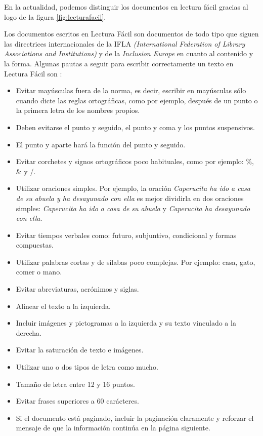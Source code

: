 En la actualidad, podemos distinguir los documentos en lectura fácil gracias al logo de la figura \ref{fig:lecturafacil}.

	
	
Los documentos escritos en Lectura Fácil \citep{wiki:lecturafacil} son documentos de todo tipo que siguen las directrices internacionales de la IFLA \textit{ (International Federation of Library Associations and Institutions)} y de la \textit{ Inclusion Europe} en cuanto al contenido y la forma.
Algunas pautas a seguir para escribir correctamente un texto en Lectura Fácil son \citep{GarciaMunoz2012LecturaFacil}:


\begin{itemize}
	\item Evitar mayúsculas fuera de la norma, es decir, escribir en mayúsculas sólo cuando dicte las reglas ortográficas, como por ejemplo, después de un punto o la primera letra de los nombres propios.
	\item Deben evitarse el punto y seguido, el punto y coma y los puntos suspensivos.
	\item El punto y aparte hará la función del punto y seguido.
	\item Evitar corchetes y signos ortográficos poco habituales, como por ejemplo: \%, \& y /.
	\item Utilizar oraciones simples. Por ejemplo, la oración \textit{Caperucita ha ido a casa de su abuela y ha desayunado con ella} es mejor dividirla en dos oraciones simples:\textit{ Caperucita ha ido a casa de su abuela} y  \textit{Caperucita ha desayunado con ella}.
	\item Evitar tiempos verbales como: futuro, subjuntivo, condicional y formas compuestas.
	\item Utilizar palabras cortas y de sílabas poco complejas. Por ejemplo: casa, gato, comer o mano.
	\item Evitar abreviaturas, acrónimos y siglas.
	\item Alinear el texto a la izquierda.
	\item Incluir imágenes y pictogramas a la izquierda y su texto vinculado a la derecha.
	\item Evitar la saturación de texto e imágenes.
	\item Utilizar uno o dos tipos de letra como mucho.
	\item Tamaño de letra entre 12 y 16 puntos.
	\item Evitar frases superiores a 60 carácteres.
	\item Si el documento está paginado, incluir la paginación claramente y reforzar el mensaje de que la información continúa en la página siguiente.
\end{itemize}

